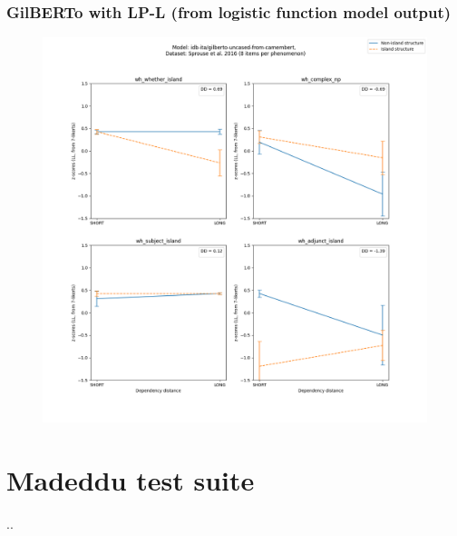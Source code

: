 \subsubsection{GilBERTo with LP-L (from logistic function model output)}
\begin{figure}[h]
	\centering
	\includegraphics[width=1\textwidth]{images/Chapter1/Sprouse_wh_idb-ita_gilberto-uncased-from-camembert_LL-zscores-likert-2022-07-11.png} 
\end{figure}

\clearpage
\section{Madeddu test suite}
..